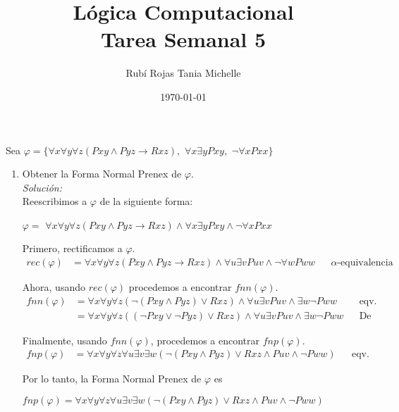 \documentclass[letterpaper,12pt]{article}
\title{Lógica Computacional \\ Tarea Semanal 5}
\author{Rubí Rojas Tania Michelle}
\date{\today}
\begin{document}
\maketitle

Sea $\varphi = \{ \forall x \forall y \forall z(Pxy \land Pyz
\rightarrow Rxz), $ $\forall x \exists y Pxy, $ $\neg \forall x Pxx\}$
\begin{enumerate}
    \item Obtener la Forma Normal Prenex de $\varphi$. \\
    \textit{Solución:} \\
    Reescribimos a $\varphi$ de la siguiente forma:
    \begin{center}
        $\varphi = $
        $\forall x \forall y \forall z(Pxy \land Pyz \rightarrow Rxz) \land 
        \forall x \exists y Pxy \land \neg \forall x Pxx$
    \end{center}

    Primero, rectificamos a $\varphi$. 
    \begin{align*}
        rec(\varphi) &= 
        \forall x \forall y \forall z(Pxy \land Pyz \rightarrow Rxz) \land 
        \forall u \exists v Puv \land \neg \forall w Pww
        && \text{$\alpha$-equivalencia}
    \end{align*}
    
    Ahora, usando $rec(\varphi)$ procedemos a encontrar $fnn(\varphi)$.
    \begin{align*}
        fnn(\varphi) 
        &= \forall x \forall y \forall z(\neg (Pxy \land Pyz) \lor Rxz) \land
        \forall u \exists v Puv \land \exists w \neg Pww
        && \text{eqv. lógicas} \\
        &= \forall x \forall y \forall z((\neg Pxy \lor \neg Pyz) \lor Rxz)
        \land \forall u \exists v Puv \land \exists w \neg Pww
        && \text{De Morgan}
    \end{align*}

    Finalmente, usando $fnn(\varphi)$,  procedemos a encontrar $fnp(\varphi)$.
    \begin{align*}
        fnp(\varphi)
        &= \forall x \forall y \forall z \forall u \exists v \exists w
        (\neg (Pxy \land Pyz) \lor Rxz \land Puv \land \neg Pww)
        && \text{eqv. lógicas}
    \end{align*}

    Por lo tanto, la Forma Normal Prenex de $\varphi$ es 
    \begin{center}
        $fnp(\varphi) = 
        \forall x \forall y \forall z \forall u \exists v \exists w
        (\neg (Pxy \land Pyz) \lor Rxz \land Puv \land \neg Pww)$
    \end{center}


\end{enumerate}
\end{document}
